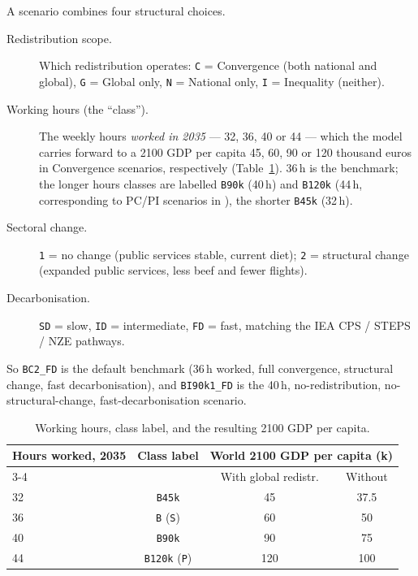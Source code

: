 \documentclass[12pt,a4paper]{article}
\newcommand{\scenario}[1]{\texttt{#1}}
\newcommand{\EUR}{\texteuro}
\begin{document}
A scenario combines four structural choices.

\begin{description}
  \item[Redistribution scope.] Which redistribution operates: \scenario{C} = Convergence (both national and global), \scenario{G} = Global only, \scenario{N} = National only, \scenario{I} = Inequality (neither). %
  \item[Working hours (the ``class'').] The weekly hours \emph{worked in 2035} --- 32, 36, 40 or 44 --- which the model carries forward to a 2100 GDP per capita 45, 60, 90 or 120 thousand euros in Convergence scenarios, respectively (Table~\ref{tab:hours}). 36\,h is the  benchmark; the longer hours classes are labelled \scenario{B90k} (40\,h) and \scenario{B120k} (44\,h, corresponding to PC/PI scenarios in \citealp{Chancel2026}), the shorter \scenario{B45k} (32\,h). %
  \item[Sectoral change.] \scenario{1} = no change (public services stable, current diet);
    \scenario{2} = structural change (expanded public services, less beef and fewer flights).
  \item[Decarbonisation.] \scenario{SD} = slow, \scenario{ID} = intermediate, \scenario{FD} = fast, matching the IEA CPS / STEPS / NZE pathways.
\end{description}

\noindent So \scenario{BC2\_FD} is the default benchmark (36\,h worked, full convergence, structural change, fast decarbonisation), and \scenario{BI90k1\_FD} is the 40\,h, no-redistribution, no-structural-change, fast-decarbonisation scenario.

\begin{table}[ht]
\centering
\caption{Working hours, class label, and the resulting 2100 GDP per capita.}
\label{tab:hours}
\begin{tabular}{lccc}
\toprule
\multirow{2}{*}{Hours worked, 2035} & \multirow{2}{*}{Class label}
  & \multicolumn{2}{c}{World 2100 GDP per capita (k\EUR)} \\
\cmidrule(lr){3-4}
 & & With global redistr. & Without \\
\midrule
32 & \scenario{B45k}            & 45  & 37.5 \\
36 & \scenario{B} (\scenario{S}) & 60 & 50   \\
40 & \scenario{B90k}            & 90  & 75   \\
44 & \scenario{B120k} (\scenario{P}) & 120 & 100 \\
\bottomrule
\end{tabular}
\end{table}
\end{document}
